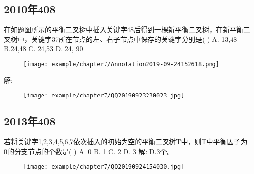 \subsection{2010年408}
在如题图所示的平衡二叉树中插入关键字48后得到一棵新平衡二叉树，在新平衡二叉树中，关键字37所在节点的左、右子节点中保存的关键字分别是(   )\newline
A. 13,48    B.24,48  C. 24,53   D. 24, 90\newline
\begin{figure}[H]
	\centering  %
	\texttt{[image: example/chapter7/Annotation2019-09-24152618.png]}
\end{figure}
解:\newline
\begin{figure}[H]
	\centering  %
	\texttt{[image: example/chapter7/QQ20190923230023.jpg]}
\end{figure}

\subsection{2013年408}
若将关键字1,2,3,4,5,6,7依次插入的初始为空的平衡二叉树T中，则T中平衡因子为0的分支节点的个数是(   )\newline
A. 0   B. 1  C. 2  D. 3
解:\newline
D.3个。
\begin{figure}[H]
	\centering  %
	\texttt{[image: example/chapter7/QQ20190924154030.jpg]}
\end{figure}




